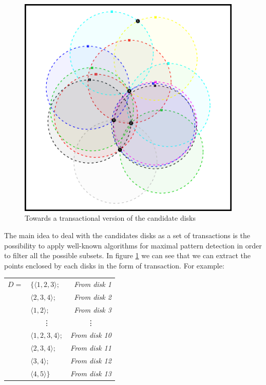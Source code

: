 \documentclass[10pt]{scrartcl}
\begin{document}
\begin{figure}   
  \centering 
  \includegraphics[width=0.95\textwidth]{../Viz/zoom1}
  \caption[]{{\small Towards a transactional version of the candidate disks}}    
  \label{fig:candidates}
\end{figure}

The main idea to deal with the candidates disks as a set of transactions is the possibility to apply well-known algorithms for maximal pattern detection in order to filter all the possible subsets.  In figure \ref{fig:candidates} we can see that we can extract the points enclosed by each disks in the form of transaction.  For example:

\vspace{2mm}
\begin{tabular}{r l r}
$D =$ 	& $\{ \langle 1, 2, 3 \rangle; $ 	& {\small \textit{From disk 1}}\\
	& $   \langle 2, 3, 4 \rangle; $ 	& {\small \textit{From disk 2}}\\
	& $   \langle 1, 2 \rangle; $	 	& {\small \textit{From disk 3}}\\
	& \multicolumn{1}{c}{\vdots}		& \multicolumn{1}{c}{\vdots} \\
	& $   \langle 1, 2, 3, 4 \rangle; $ 	& {\small \textit{From disk 10}}\\
	& $   \langle 2, 3, 4 \rangle; $ 	& {\small \textit{From disk 11}}\\
	& $   \langle 3, 4 \rangle; $ 		& {\small \textit{From disk 12}}\\
	& $   \langle 4, 5 \rangle \} $		& {\small \textit{From disk 13}}\\
\end{tabular}
\vspace{2mm}
\end{document}
